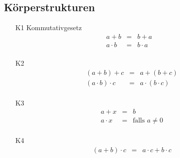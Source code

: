 \subsection{Körperstrukturen}
\begin{itemize}
  \item[K1] Kommutativgesetz
  \begin{align*}
    a+b &=& b + a\\
    a\cdot b &=& b\cdot a & \\
  \end{align*}
  \item[K2]
    \begin{align*}
      (a+b)+c &=&a+(b+c)\\
      (a\cdot b)\cdot c&=&a\cdot(b\cdot c)\\
    \end{align*}
  \item[K3]
    \begin{align*}
      a+x&=&b\\
      a\cdot x&=& \text{falls $a\neq 0$}\\
    \end{align*}
  \item[K4]
    \begin{align*}
      (a+b)\cdot c&=& a\cdot c + b\cdot c
    \end{align*}
\end{itemize}

